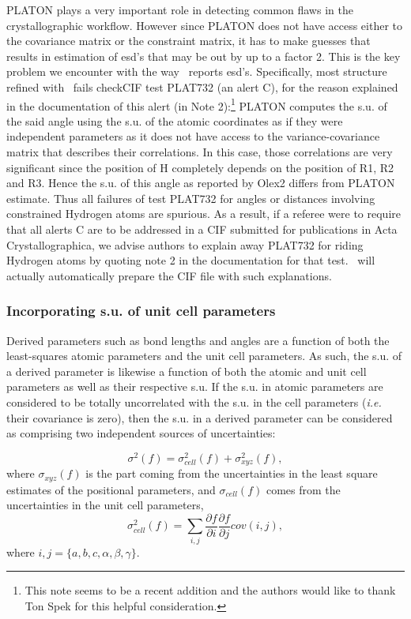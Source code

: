 \documentclass[pdf]{iucr}
\newcommand{\partialder}[2]{\frac{\partial #1}{\partial #2}}
\begin{document}
PLATON plays a very important role in detecting common flaws in the crystallographic workflow. However since PLATON does not have access either to the covariance matrix or the constraint matrix, it has to make guesses that results in estimation of esd's that may be out by up to a factor 2. This is the key problem we encounter with the way \olexrefine\ reports esd's. Specifically, most structure refined with \olexrefine\ fails checkCIF test PLAT732 (an alert C), for the reason explained in the documentation of this alert (in Note 2):\footnote{This note seems to be a recent addition and the authors would like to thank Ton Spek for this helpful consideration.} PLATON computes the s.u. of the said angle using the s.u. of the atomic coordinates as if they were independent parameters as it does not have access to the variance-covariance matrix that describes their correlations. In this case, those correlations are very significant since the position of H completely depends on the position of R1, R2 and R3. Hence the s.u. of this angle as reported by Olex2 differs from PLATON estimate. Thus all failures of test PLAT732 for angles or distances involving constrained Hydrogen atoms are spurious. As a result, if a referee were to require that all alerts C are to be addressed in a CIF submitted for publications in Acta Crystallographica, we advise authors to explain away PLAT732 for riding Hydrogen atoms by quoting note 2 in the documentation for that test. \olexrefine\ will actually automatically prepare the CIF file with such explanations.

\subsubsection{Incorporating s.u. of unit cell parameters}

Derived parameters such as bond lengths and angles are a function of both the least-squares atomic parameters and the unit cell parameters. As such, the s.u. of a derived parameter is likewise a function of both the atomic and unit cell parameters as well as their respective s.u. If the s.u. in atomic parameters are considered to be totally uncorrelated with the s.u. in the cell parameters (\emph{i.e.} their covariance is zero), then the s.u. in a derived parameter can be considered as comprising two independent sources of uncertainties:

\begin{equation}
\sigma^2(f) = \sigma^2_{cell}(f) + \sigma^2_{xyz}(f)
\label{eqn:sigma_d},
\end{equation}
where $\sigma_{xyz}(f)$ is the part coming from the uncertainties in the least square estimates of the positional parameters, and $\sigma_{cell}(f)$ comes from the uncertainties in the unit cell parameters,
\begin{equation}
\sigma^2_{cell}(f) = \sum_{i,j}{{\partialder{f}{i}\partialder{f}{j} cov\left(i,j\right)}}
\label{eqn:sigma_cell},
\end{equation}
where $i,j=\lbrace{a,b,c,\alpha,\beta,\gamma\rbrace}$.
\end{document}
